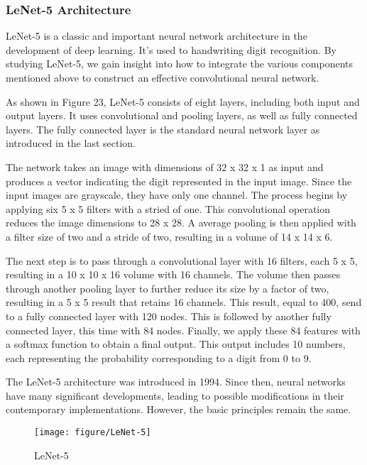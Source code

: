 \documentclass{article}
\begin{document}
\newpage
\subsubsection{LeNet-5 Architecture}

LeNet-5 is a classic and important neural network architecture in the development of deep learning. It’s used to handwriting digit recognition. By studying LeNet-5, we gain insight into how to integrate the various components mentioned above to construct an effective convolutional neural network.

As shown in Figure 23, LeNet-5 consists of eight layers, including both input and output layers. It uses convolutional and pooling layers, as well as fully connected layers. The fully connected layer is the standard neural network layer as introduced in the last section.

The network takes an image with dimensions of 32 x 32 x 1 as input and produces a vector indicating the digit represented in the input image. Since the input images are grayscale, they have only one channel. The process begins by applying six 5 x 5 filters with a stried of one. This convolutional operation reduces the image dimensions to 28 x 28. A average pooling is then applied with a filter size of two and a stride of two, resulting in a volume of 14 x 14 x 6.

The next step is to pass through a convolutional layer with 16 filters, each 5 x 5, resulting in a 10 x 10 x 16 volume with 16 channels. The volume then passes through another pooling layer to further reduce its size by a factor of two, resulting in a 5 x 5 result that retains 16 channels. This result, equal to 400, send to a fully connected layer with 120 nodes. This is followed by another fully connected layer, this time with 84 nodes. Finally, we apply these 84 features with a softmax function to obtain a final output. This output includes 10 numbers, each representing the probability corresponding to a digit from 0 to 9.

The LeNet-5 architecture was introduced in 1994. Since then, neural networks have many significant developments, leading to possible modifications in their contemporary implementations. However, the basic principles remain the same.


\begin{figure}[htbp]
        \centering
        \texttt{[image: figure/LeNet-5]}
        \caption{LeNet-5}
     \end{figure}
\end{document}
